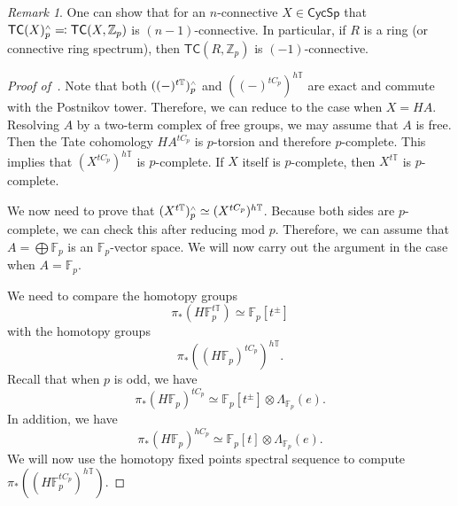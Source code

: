 \documentclass[10pt, oneside]{memoir}
\theoremstyle{definition}
\theoremstyle{remark}
\newtheorem{rmk}[thm]{Remark}
\theoremstyle{plain}
\theoremstyle{definition}
\theoremstyle{remark}
\newcommand{\Z}{\mathbb{Z}}
\newcommand{\F}{\mathbb{F}}
\newcommand{\T}{\mathbb{T}}
\newcommand{\ms}[1]{\mathsf{#1}}
\newcommand{\1}{\mathbf{1}}
\newcommand{\2}{\mathbf{2}}
\newcommand{\3}{\mathbf{3}}
\newcommand{\TC}{\ms{TC}}
\newcommand{\sw}{\mathsmaller{\wedge}}
\begin{document}
\begin{rmk}
    One can show that for an \(n \)-connective \(X \in \ms{CycSp} \) that \(\TC(X)^{\sw}_p \eqqcolon \TC(X,\Z_p) \) is \((n-1) \)-connective. In particular, if \(R \) is a ring (or connective ring spectrum), then \(\TC(R, \Z_p) \) is \((-1) \)-connective.
\end{rmk}

\begin{proof}[Proof of~]
    Note that both \(((-)^{t\T})_p^{\sw} \) and \(((-)^{tC_p})^{h\T} \) are exact and commute with the Postnikov tower. Therefore, we can reduce to the case when \(X = HA \). Resolving \(A \) by a two-term complex of free groups, we may assume that \(A \) is free. Then the Tate cohomology \(HA^{tC_p} \) is \(p \)-torsion and therefore \(p \)-complete. This implies that \((X^{tC_p})^{h\T} \) is \(p \)-complete. If \(X \) itself is \(p \)-complete, then \(X^{t\T} \) is \(p \)-complete.

    We now need to prove that \((X^{t\T})^{\sw}_p \simeq (X^{tC_p})^{h\T} \). Because both sides are \(p \)-complete, we can check this after reducing mod \(p \). Therefore, we can assume that \(A = \bigoplus \F_p \) is an \(\F_p \)-vector space. We will now carry out the argument in the case when \(A = \F_p \).

    We need to compare the homotopy groups
    \[ \pi_*(H \F_p^{t\T}) \simeq \F_p[t^{\pm}] \]
    with the homotopy groups
    \[ \pi_* ((H\F_p)^{tC_p})^{h\T}. \]
    Recall that when \(p \) is odd, we have
    \[ \pi_* (H\F_p)^{tC_p} \simeq \F_p[t^{\pm}] \otimes \Lambda_{\F_p}(e). \]
    In addition, we have
    \[ \pi_* (H\F_p)^{h C_p} \simeq \F_p[t] \otimes \Lambda_{\F_p}(e). \]
    We will now use the homotopy fixed points spectral sequence to compute \(\pi_* ((H \F_p^{tC_p})^{h\T}) \).


\end{proof}
\end{document}
